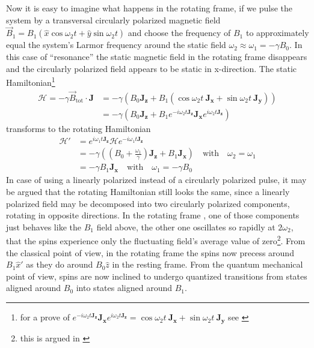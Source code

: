 \documentclass[11.5pt,a4paper]{article}
\begin{document}
Now it is easy to imagine what happens in the rotating frame, if we pulse the system by a transversal circularly polarized magnetic field $\vec{B}_1 = B_1 (\hat{x} \cos \omega_2 t + \hat{y} \sin \omega_2 t)$ and choose the frequency of $B_1$ to approximately equal the system's Larmor frequency around the static field $\omega_2 \approx \omega_1 = - \gamma B_0$. In this case of ``resonance'' the static magnetic field in the rotating frame disappears and the circularly polarized field appears to be static in x-direction. The static Hamiltonian\footnote{ for a prove of $e^{-i \omega_2 t \mathbf{J_z}} \mathbf{J_x} e^{i \omega_2 t \mathbf{J_z}} = \cos \omega_2 t \ \mathbf{J_x} + \sin \omega_2 t \ \mathbf{J_y}$ see \cite[chap 2.6 Exponential Operators, p. 27f]{slichter}}
\begin{align}
 \mathcal{H} = -\gamma \vec{B}_\text{tot} \cdot \mathbf{J}  & = - \gamma \left( B_0 \mathbf{J_z} + B_1 ( \cos \omega_2 t \ \mathbf{J_x} + \sin \omega_2 t \ \mathbf{J_y} ) \right) \\
  & = - \gamma \left( B_0 \mathbf{J_z} + B_1 e^{-i \omega_2 t \mathbf{J_z}} \mathbf{J_x} e^{i \omega_2 t \mathbf{J_z}} \right)
\end{align}
transforms to the rotating Hamiltonian
\begin{align}
\mathcal{H'} & = e^{i \omega_1 t \mathbf{J_z}} \mathcal{H} e^{-i \omega_1 t \mathbf{J_z}} \\
& = -\gamma \left( (B_0 + \frac{\omega_1}{\gamma}) \mathbf{J_z} + B_1 \mathbf{J_x} \right)  \quad \text{with} \quad \omega_2 = \omega_1\\
  & = - \gamma B_1 \mathbf{J_x} \quad \text{with} \quad \omega_1 = - \gamma B_0 
\end{align}
In case of using a linearly polarized instead of a circularly polarized pulse, it may be argued that the rotating Hamiltonian still looks the same, since a linearly polarized field may be decomposed into two circularly polarized components, rotating in opposite directions. In the rotating frame , one of those components just behaves like the $B_1$ field above, the other one oscillates so rapidly at $2\omega_2$, that the spins experience only the fluctuating field's average value of zero\footnote{this is argued in \cite[chap. 4.2.2 The resonant frequency field, p.111f]{nmr-ox}}. From the classical point of view, in the rotating frame the spins now precess around $B_1 \hat{x}'$ as they do around $B_0 \hat{z}$ in the resting frame. From the quantum mechanical point of view, spins are now inclined to undergo quantized transitions from states aligned around $B_0$ into states aligned around $B_1$.
\end{document}
